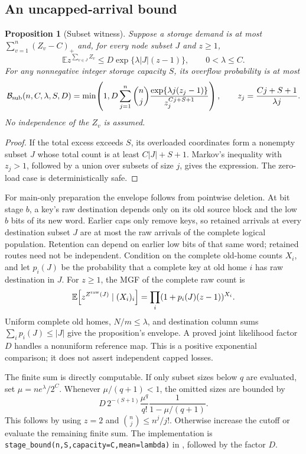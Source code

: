 \documentclass[11pt]{article}
\newtheorem{proposition}[theorem]{Proposition}
\theoremstyle{definition}
\theoremstyle{remark}
\newcommand{\E}{\mathbb E}
\begin{document}
\subsection{An uncapped-arrival bound}
\begin{proposition}[Subset witness]\label{prop:general-subset}
Suppose a storage demand is at most $\sum_{v=1}^n(Z_v-C)_+$ and, for every
node subset $J$ and $z\ge1$,
\[
 \E z^{\sum_{v\in J}Z_v}
 \le D\exp\{\lambda |J|(z-1)\},
 \qquad 0<\lambda\le C.
\]
For any nonnegative integer storage capacity $S$, its overflow probability
is at most
\begin{equation}\label{eq:general-subset}
 \mathcal B_{\rm sub}(n,C,\lambda,S,D)
 =\min\!\left(1,D\sum_{j=1}^n\binom nj
       \frac{\exp\{\lambda j(z_j-1)\}}{z_j^{Cj+S+1}}\right),
 \qquad z_j=\frac{Cj+S+1}{\lambda j}.
\end{equation}
No independence of the $Z_v$ is assumed.
\end{proposition}
\begin{proof}
If the total excess exceeds $S$, its overloaded coordinates form a
nonempty subset $J$ whose total count is at least $C|J|+S+1$.
Markov's inequality with $z_j>1$, followed by a union over subsets of size
$j$, gives the expression. The zero-load case is deterministically safe.
\end{proof}

For main-only preparation the envelope follows from pointwise deletion.
At bit stage $b$, a key's raw destination depends only on its old source
block and the low $b$ bits of its new word. Earlier caps only remove keys,
so retained arrivals at every destination subset $J$ are at most the raw
arrivals of the complete logical population. Retention can depend on
earlier low bits of that same word; retained routes need not be independent.
Condition on the complete old-home counts $X_i$, and let $p_i(J)$ be the
probability that a complete key at old home $i$ has raw destination in $J$.
For $z\ge1$, the MGF of the complete raw count is
\[
 \E\!\left[z^{Z^{\rm raw}(J)}\mid(X_i)_i\right]
 =\prod_i(1+p_i(J)(z-1))^{X_i}.
\]
Uniform complete old homes, $N/m\le\lambda$, and destination column sums
$\sum_i p_i(J)\le |J|$ give the proposition's envelope. A proved joint
likelihood factor $D$ handles a nonuniform reference map. This is a positive
exponential comparison; it does not assert independent capped losses.

The finite sum is directly computable. If only subset sizes below $q$ are
evaluated, set $\mu=ne^\lambda/2^C$. Whenever $\mu/(q+1)<1$, the omitted
sizes are bounded by
\[
 D\,2^{-(S+1)}\frac{\mu^q}{q!}
              \frac{1}{1-\mu/(q+1)}.
\]
This follows by using $z=2$ and $\binom nj\le n^j/j!$. Otherwise increase
the cutoff or evaluate the remaining finite sum. The implementation is
\texttt{stage\_bound(n,S,capacity=C,mean=lambda)} in
, followed by the factor $D$.
\end{document}
